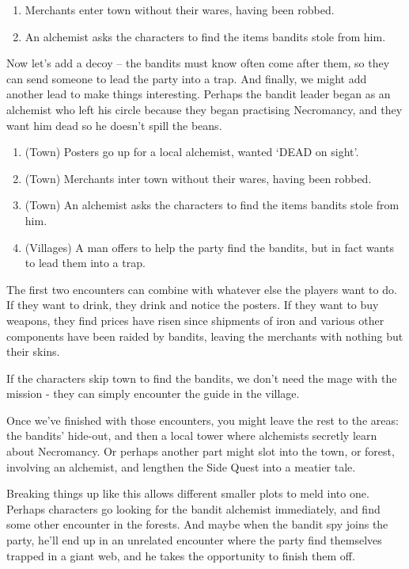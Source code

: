 \begin{multicols}{2}
\begin{enumerate}
  \item
  Merchants enter town without their wares, having been robbed.
  \item
  An alchemist asks the characters to find the items bandits stole from him.
\end{enumerate}

Now let's add a decoy -- the bandits must know  often come after them, so they can send someone to lead the party into a trap.
And finally, we might add another lead to make things interesting.
Perhaps the bandit leader began as an alchemist who left his circle because they began practising Necromancy, and they want him dead so he doesn't spill the beans.

\begin{enumerate}
  \item
  (Town)
  Posters go up for a local alchemist, wanted `DEAD on sight'.
  \item
  (Town) 
  Merchants inter town without their wares, having been robbed.
  \item
  (Town)
  An alchemist asks the characters to find the items bandits stole from him.
  \item
  (Villages)
  A man offers to help the party find the bandits, but in fact wants to lead them into a trap.
\end{enumerate}

The first two encounters can combine with whatever else the players want to do.
If they want to drink, they drink and notice the posters.
If they want to buy weapons, they find prices have risen since shipments of iron and various other components have been raided by bandits, leaving the merchants with nothing but their skins.

If the characters skip town to find the bandits, we don't need the mage with the mission - they can simply encounter the guide in the village.

Once we've finished with those encounters, you might leave the rest to the areas: the bandits' hide-out, and then a local tower where alchemists secretly learn about Necromancy.
Or perhaps another part might slot into the town, or forest, involving an alchemist, and lengthen the Side Quest into a meatier tale.

Breaking things up like this allows different smaller plots to meld into one.
Perhaps characters go looking for the bandit alchemist immediately, and find some other encounter in the forests.
And maybe when the bandit spy joins the party, he'll end up in an unrelated encounter where the party find themselves trapped in a giant web, and he takes the opportunity to finish them off.

\end{multicols}


